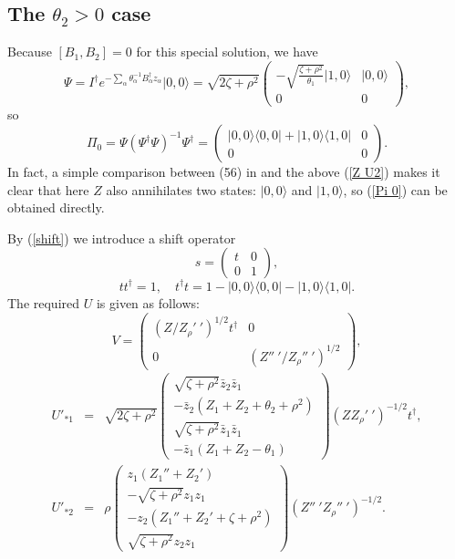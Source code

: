 \documentclass[a4paper,a4paper]{article}
\begin{document}
\subsection{The $\theta_2>0$ case}

Because $[B_1,B_2]=0$ for this special solution, we have
\begin{equation}
\Psi=I^\dag e^{-\sum_\alpha\theta_\alpha^{-1}B_\alpha^\dag
z_\alpha}|0,0\rangle=\sqrt{2\zeta+\rho^2}\left(\begin{array}{cc}
-\sqrt{\frac{\zeta+\rho^2}{\theta_1}}|1,0\rangle & |0,0\rangle \\
0 & 0 \end{array}\right),
\end{equation}
so
\begin{equation}\label{Pi 0}
\Pi_0=\Psi(\Psi^\dag\Psi)^{-1}\Psi^\dag=\left(\begin{array}{cc}
|0,0\rangle\langle 0,0|+|1,0\rangle\langle 1,0| & 0 \\
0 & 0 \end{array}\right).
\end{equation}
In fact, a simple comparison between (56) in \cite{TianZhu} and
the above (\ref{Z U2}) makes it clear that here $Z$ also
annihilates two states: $|0,0\rangle$ and $|1,0\rangle$, so
(\ref{Pi 0}) can be obtained directly.

By (\ref{shift}) we introduce a shift operator
\begin{equation}
s=\left(\begin{array}{cc} t & 0 \\
0 & 1 \end{array}\right),
\end{equation}
\begin{equation}
tt^\dag=1,\quad t^\dag t=1-|0,0\rangle\langle
0,0|-|1,0\rangle\langle 1,0|.
\end{equation}
The required $U$  is given as follows:
\begin{equation}
V=\left(\begin{array}{cc} (Z/Z_\rho'~')^{1/2}t^\dag & 0 \\
0 & (Z''~'/Z_\rho''~')^{1/2} \end{array}\right),
\end{equation}
\begin{eqnarray}
U'_{*1}&=&\sqrt{2\zeta+\rho^2}\left(\begin{array}{c}
\sqrt{\zeta+\rho^2}\bar{z}_2\bar{z}_1 \\
-\bar{z}_2(Z_1+Z_2+\theta_2+\rho^2) \\
\sqrt{\zeta+\rho^2}\bar{z}_1\bar{z}_1 \\
-\bar{z}_1(Z_1+Z_2-\theta_1) \end{array}\right)(Z
Z_\rho'~')^{-1/2}t^\dag,\\
U'_{*2}&=&\rho\left(\begin{array}{c} z_1(Z_1''+Z_2') \\
-\sqrt{\zeta+\rho^2}z_1 z_1 \\
-z_2(Z_1''+Z_2'+\zeta+\rho^2) \\
\sqrt{\zeta+\rho^2}z_2 z_1
\end{array}\right)(Z''~'Z_\rho''~')^{-1/2}.\label{Up 2}
\end{eqnarray}
\end{document}
